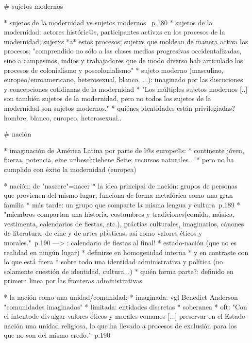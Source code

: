 # sujetos modernos

* sujetos de la modernidad vs sujetos modernos ~\cite{SzIr2009}{p.180}
  * sujetos de la modernidad: actores históric@s, participantes activxs en los procesos de la modernidad; sujetxs *a* estos procesos; sujetxs que moldean de manera activa los procesos;  "comprendido no sólo a las clases medias progresivas occidentalizadas, sino a campesinos, indios y trabajadores que de modo diverso hab articulado los procesos de colonialismo y poscolonialismo"
  * sujeto moderno (masculino, europeo/euroamericano, heterosexual, blanco, ...): imaginado por las discuciones y concepciones cotidianas de la modernidad
  * "Los múltiples sujetos modernos [..] son también sujetos de la modernidad, pero no todos los sujetos de la modernidad son sujetos modernos."
* quiénes identidades están privilegiadas? hombre, blanco, europeo, heterosexual..



# nación

* imaginación de América Latina por parte de l@s europe@s:
  * continente jóven, fuerza, potencia, eine unbeschriebene Seite; recursos naturales...
  * pero no ha cumplido con éxito la modernidad (europea)

* nación: de "nascere"=nacer
* la idea principal de nación: grupos de personas que provienen del mismo lugar; funciona de forma metafórica como una gran familia
* más tarde: un grupo que comparte la misma lengua y cultura~\cite{SzIr2009}{p.189}
  * "miembros compartan una historia, costumbres y tradiciones(comida, música, vestimenta, calendarios de fiestas, etc.), práctias culturales, imaginarios, cánones de literatura, de cine y de artes plásticas, así como valores éticos y morales."~\cite{SzIr2009}{p.190}
   ---> : calendario de fiestas al final!
* estado-nación (que no es realidad en ningún lugar)
  * definirse en homogenidad interna
  * y en contraste con lo que está fuera
  * sobre todo una identidad administrativa y política (no solamente cuestión de identidad, cultura...)
  * quién forma parte?: definido en primera linea por las fronteras administrativas

* la nación como una unidad/comunidad:
  * imaginada: vgl Benedict Anderson "comunidades imaginadas"
  * limitada: entidades discretas
  * soberanea
  * oft: "Con el intentode divulgar valores éticos y morales comunes [...] preservar en el Estado-nación una unidad religiosa, lo que ha llevado a procesos de exclusión para los que no son del mismo credo."~\cite{SzIr2009}{p.190}

